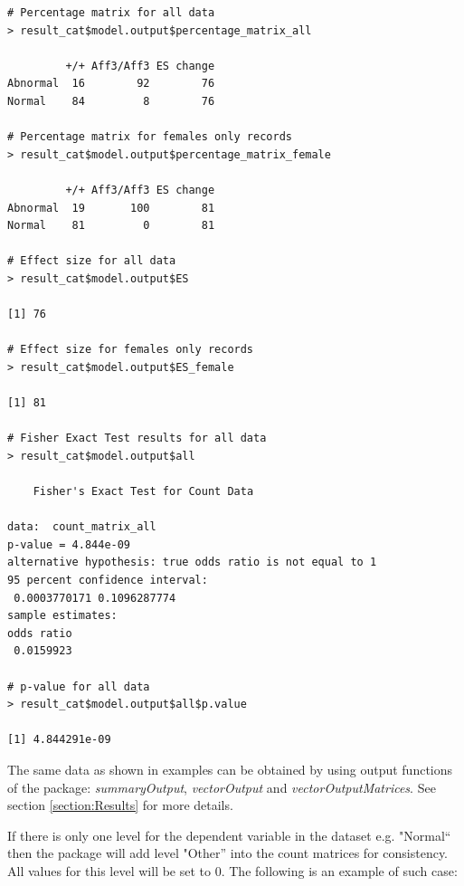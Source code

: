 \documentclass[12pt,a4paper]{article}
\begin{document}
\begin{verbatim}
# Percentage matrix for all data
> result_cat$model.output$percentage_matrix_all

         +/+ Aff3/Aff3 ES change
Abnormal  16        92        76
Normal    84         8        76

# Percentage matrix for females only records
> result_cat$model.output$percentage_matrix_female

         +/+ Aff3/Aff3 ES change
Abnormal  19       100        81
Normal    81         0        81

# Effect size for all data
> result_cat$model.output$ES

[1] 76

# Effect size for females only records
> result_cat$model.output$ES_female

[1] 81

# Fisher Exact Test results for all data
> result_cat$model.output$all

	Fisher's Exact Test for Count Data

data:  count_matrix_all 
p-value = 4.844e-09
alternative hypothesis: true odds ratio is not equal to 1 
95 percent confidence interval:
 0.0003770171 0.1096287774 
sample estimates:
odds ratio 
 0.0159923
 
# p-value for all data
> result_cat$model.output$all$p.value

[1] 4.844291e-09
\end{verbatim}
\endgroup

The same data as shown in examples can be obtained by using output functions of the package: \textit{summaryOutput}, \textit{vectorOutput} and \textit{vectorOutputMatrices}. See section \ref{section:Results} for more details.

If there is only one level for the dependent variable in the dataset e.g. "Normal`` then the package will add level "Other'' into the count matrices for consistency. All values for this level will be set to 0.
The following is an example of such case:
\end{document}
